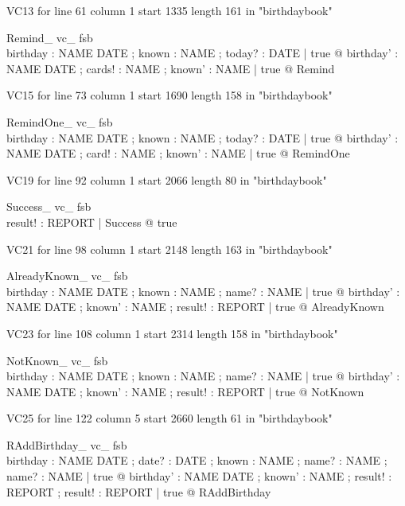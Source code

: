 \documentclass{article}
\begin{document}
VC13 for line 61 column 1 start 1335 length 161 in "birthdaybook"
\begin{theorem}{ Remind\_ vc\_ fsb}\\
 \forall birthday : NAME \pfun DATE ; known : \power NAME ; today? : DATE | true @ \exists birthday' : NAME \pfun DATE ; cards! : \power NAME ; known' : \power NAME | true @ Remind \\

\end{theorem}

VC15 for line 73 column 1 start 1690 length 158 in "birthdaybook"
\begin{theorem}{ RemindOne\_ vc\_ fsb}\\
 \forall birthday : NAME \pfun DATE ; known : \power NAME ; today? : DATE | true @ \exists birthday' : NAME \pfun DATE ; card! : NAME ; known' : \power NAME | true @ RemindOne \\

\end{theorem}

VC19 for line 92 column 1 start 2066 length 80 in "birthdaybook"
\begin{theorem}{ Success\_ vc\_ fsb}\\
 \exists result! : REPORT | Success @ true \\

\end{theorem}

VC21 for line 98 column 1 start 2148 length 163 in "birthdaybook"
\begin{theorem}{ AlreadyKnown\_ vc\_ fsb}\\
 \forall birthday : NAME \pfun DATE ; known : \power NAME ; name? : NAME | true @ \exists birthday' : NAME \pfun DATE ; known' : \power NAME ; result! : REPORT | true @ AlreadyKnown \\

\end{theorem}

VC23 for line 108 column 1 start 2314 length 158 in "birthdaybook"
\begin{theorem}{ NotKnown\_ vc\_ fsb}\\
 \forall birthday : NAME \pfun DATE ; known : \power NAME ; name? : NAME | true @ \exists birthday' : NAME \pfun DATE ; known' : \power NAME ; result! : REPORT | true @ NotKnown \\

\end{theorem}

VC25 for line 122 column 5 start 2660 length 61 in "birthdaybook"
\begin{theorem}{ RAddBirthday\_ vc\_ fsb}\\
 \forall birthday : NAME \pfun DATE ; date? : DATE ; known : \power NAME ; name? : NAME ; name? : NAME | true @ \exists birthday' : NAME \pfun DATE ; known' : \power NAME ; result! : REPORT ; result! : REPORT | true @ RAddBirthday \\

\end{theorem}
\end{document}
